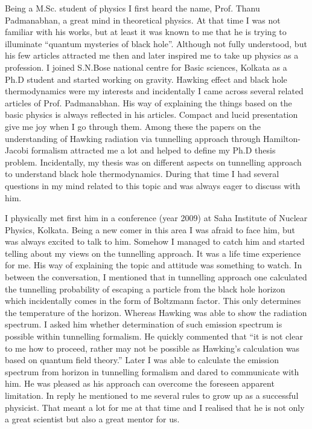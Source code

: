 \documentclass[prd, preprint, longbibliography, 11pt]{revtex4-1}
\begin{document}
\noindent %
Being a M.Sc. student of physics I first heard the name, Prof. Thanu Padmanabhan, a great mind in theoretical physics. At that time I was not familiar with his works, but at least it was known to me that he is trying to illuminate ``quantum mysteries of black hole''. Although not fully understood, but his few articles attracted me then and later inspired me to take up physics as a profession. I joined S.N.Bose national centre for Basic sciences, Kolkata as a Ph.D student and started working on gravity. Hawking effect \cite{Hawking:1974rv,Hawking:1975vcx} and black hole thermodynamics \cite{Bekenstein:1973ur,Bekenstein:1974ax} were my interests and incidentally I came across several related articles of Prof. Padmanabhan. His way of explaining the things based on the basic physics is always reflected in his articles. Compact and lucid presentation give me joy when I go through them.  Among these the papers on the understanding of Hawking radiation via tunnelling approach through Hamilton-Jacobi formalism \cite{Srinivasan:1998ty} attracted me a lot and helped to define my Ph.D thesis problem.  Incidentally, my thesis \cite{Majhi:2010onr} was on different aspects on tunnelling approach to understand black hole  thermodynamics. During that time I had several questions in my mind related to this topic and was always eager to discuss with him.

I physically met first him in a conference (year 2009) at Saha Institute of Nuclear Physics, Kolkata. Being a new comer in this area I was afraid to face him, but was always excited to talk to him. Somehow I managed to catch him and started telling about my views on the tunnelling approach. It was a life time experience for me. His way of explaining the topic and attitude was something to watch. In between the conversation, I mentioned that in tunnelling approach one calculated the tunnelling probability of escaping a particle from the black hole horizon which incidentally comes in the form of Boltzmann factor. This only determines the temperature of the horizon. Whereas Hawking was able to show the radiation spectrum. I asked him whether determination of such emission spectrum is possible within tunnelling formalism. He quickly commented that ``it is not clear to me how to proceed, rather may not be possible as Hawking's calculation was based on quantum field theory.''  Later I was able to calculate the emission spectrum from horizon in tunnelling formalism \cite{Banerjee:2009wb} and dared to communicate with him. He was pleased as his approach can overcome the foreseen apparent limitation. In reply he mentioned to me several rules to grow up as a successful physicist. That meant a lot for me at that time and I realised that he is not only a great scientist but also a great mentor for us. 
\end{document}
